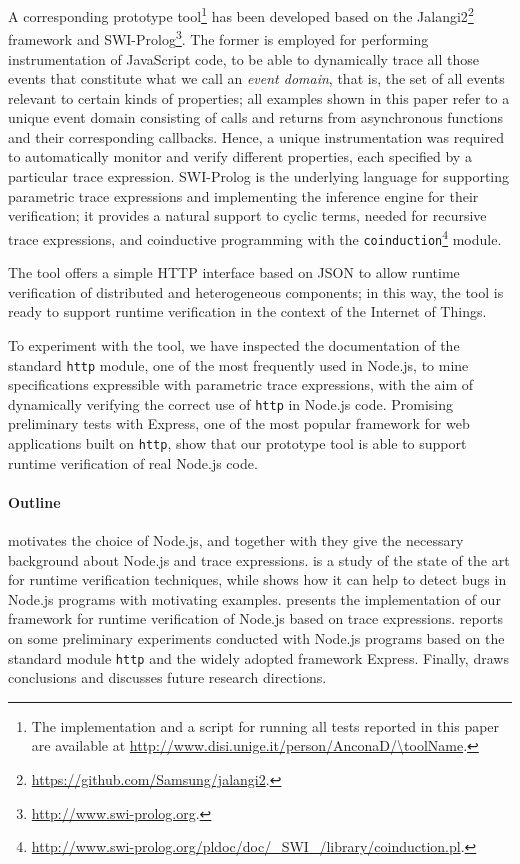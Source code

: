 A corresponding prototype tool\footnote{The implementation and a script for running all tests reported in this paper are available at \url{http://www.disi.unige.it/person/AnconaD/\toolName}.} has been developed based on the Jalangi2\footnote{\url{https://github.com/Samsung/jalangi2}.}
framework and SWI-Prolog\footnote{\url{http://www.swi-prolog.org}.}.
The former is employed for performing instrumentation of JavaScript code, to be able
to dynamically trace all those events that constitute what we call an \emph{event domain}, that is, the set
of all events relevant to certain kinds of properties;
all examples shown in this paper refer to a unique event domain consisting of calls and returns
from asynchronous functions and their corresponding callbacks. Hence, a unique instrumentation
was required to automatically monitor and verify different properties, each specified by a particular trace expression.
SWI-Prolog is the underlying language for supporting parametric
trace expressions and implementing the inference engine for their verification; it provides
a natural support to cyclic terms, needed for recursive trace expressions, and coinductive
programming with the \lstinline{coinduction}\footnote{\url{http://www.swi-prolog.org/pldoc/doc/_SWI_/library/coinduction.pl}.}
module. 

The tool offers a simple HTTP interface based on JSON to allow runtime verification of
distributed and heterogeneous components; in this way, the tool is ready to
support runtime verification in the context of the Internet of Things.

To experiment with the tool, we have inspected the documentation of the standard \lstinline{http} module, one of the most frequently used 
in Node.js, to mine specifications expressible with parametric trace expressions, with the aim of dynamically verifying
the correct use of \lstinline{http} in Node.js code.
Promising preliminary tests with Express, one of the most popular framework for web applications built on \lstinline{http}, show
that our prototype tool is able to support runtime verification of real Node.js code.

\paragraph{Outline}
 motivates the choice of Node.js, and together with  they give the necessary background about Node.js and trace expressions.
 is a study of the state of the art for runtime verification techniques, while  shows how it can help to detect bugs in Node.js programs with motivating examples.
 presents the implementation of our framework for runtime verification of Node.js based on trace expressions.
 reports on some preliminary experiments conducted with Node.js programs based on the standard module
\lstinline{http} and the widely adopted framework Express.
Finally,  draws conclusions and discusses future research directions.
